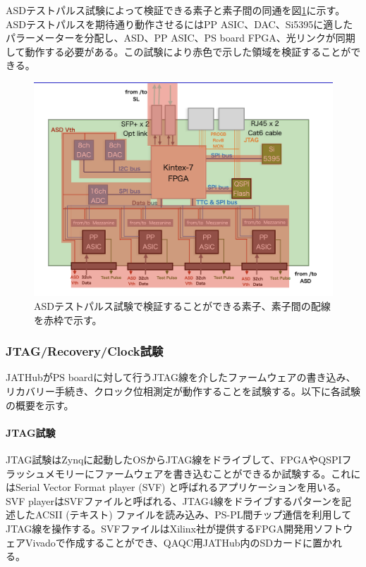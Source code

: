 ASDテストパルス試験によって検証できる素子と素子間の同通を図\ref{QAQCasdtpelements}に示す。ASDテストパルスを期待通り動作させるにはPP ASIC、DAC、Si5395に適したパラーメーターを分配し、ASD、PP ASIC、PS board FPGA、光リンクが同期して動作する必要がある。この試験により赤色で示した領域を検証することができる。
\baselineskip

\begin{figure} 
\centering
\includegraphics[width=16cm]{fig/QAQC/QAQCasdtpelements.png}
\caption[ASDテストパルス試験で検証できる素子]{ASDテストパルス試験で検証することができる素子、素子間の配線を赤枠で示す。}
\label{QAQCasdtpelements}
\end{figure}

\subsubsection{JTAG/Recovery/Clock試験}
\baselineskip

\label{subsubsec_jtag}
JATHubがPS boardに対して行うJTAG線を介したファームウェアの書き込み、リカバリー手続き、クロック位相測定が動作することを試験する。以下に各試験の概要を示す。

\paragraph{JTAG試験}\par
JTAG試験はZynqに起動したOSからJTAG線をドライブして、FPGAやQSPIフラッシュメモリーにファームウェアを書き込むことができるか試験する。これにはSerial Vector Format player (SVF) と呼ばれるアプリケーションを用いる。
SVF playerはSVFファイルと呼ばれる、JTAG4線をドライブするパターンを記述したACSII (テキスト) ファイルを読み込み、PS-PL間チップ通信を利用してJTAG線を操作する。SVFファイルはXilinx社が提供するFPGA開発用ソフトウェアVivadoで作成することができ、QAQC用JATHub内のSDカードに置かれる。
\baselineskip

